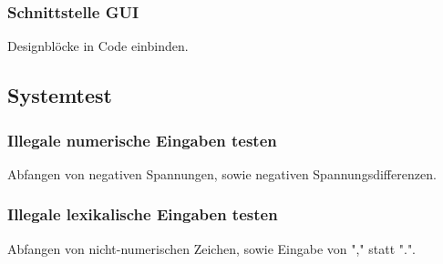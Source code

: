 \subsubsection{Schnittstelle GUI}
Designblöcke in Code einbinden.
\subsection{Systemtest}
\subsubsection{Illegale numerische Eingaben testen}
Abfangen von negativen Spannungen, sowie negativen Spannungsdifferenzen. 
\subsubsection{Illegale lexikalische Eingaben testen}
Abfangen von nicht-numerischen Zeichen, sowie Eingabe von "," statt ".".
